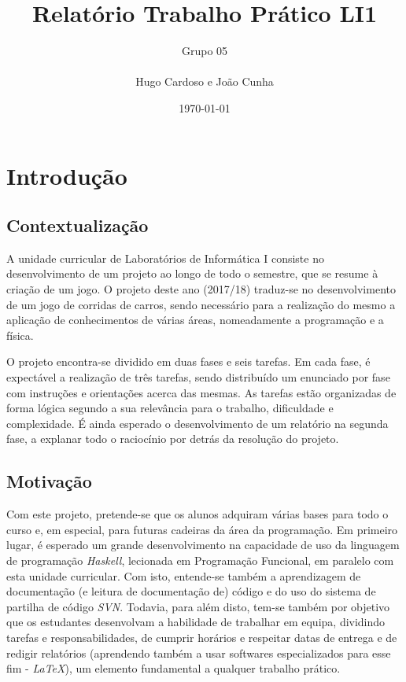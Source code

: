 \documentclass[a4paper]{report}
\begin{document}
\title{Relatório Trabalho Prático LI1}
\author{Grupo 05\\
\\
Hugo Cardoso e João Cunha}
\date{\today}

\maketitle

\tableofcontents

\listoffigures

\chapter{Introdução}

\section{Contextualização}

A unidade curricular de Laboratórios de Informática I consiste no desenvolvimento de um projeto ao longo de todo o semestre, que se resume à criação de um jogo. O projeto deste ano (2017/18) traduz-se no desenvolvimento de um jogo de corridas de carros, sendo necessário para a realização do mesmo a aplicação de conhecimentos de várias áreas, nomeadamente a programação e a física.

O projeto encontra-se dividido em duas fases e seis tarefas. Em cada fase, é expectável a realização de três tarefas, sendo distribuído um enunciado por fase com instruções e orientações acerca das mesmas. As tarefas estão organizadas de forma lógica segundo a sua relevância para o trabalho, dificuldade e complexidade. É ainda esperado o desenvolvimento de um relatório na segunda fase, a explanar todo o raciocínio por detrás da resolução do projeto.

\section{Motivação}

Com este projeto, pretende-se que os alunos adquiram várias bases para todo o curso e, em especial, para futuras cadeiras da área da programação. Em primeiro lugar, é esperado um grande desenvolvimento na capacidade de uso da linguagem de programação \textit{Haskell}, lecionada em Programação Funcional, em paralelo com esta unidade curricular. Com isto, entende-se também a aprendizagem de documentação (e leitura de documentação de) código e do uso do sistema de partilha de código \textit{SVN}. Todavia, para além disto, tem-se também por objetivo que os estudantes desenvolvam a habilidade de trabalhar em equipa, dividindo tarefas e responsabilidades, de cumprir horários e respeitar datas de entrega e de redigir relatórios (aprendendo também a usar softwares especializados para esse fim - \textit{LaTeX}), um elemento fundamental a qualquer trabalho prático.
\end{document}

